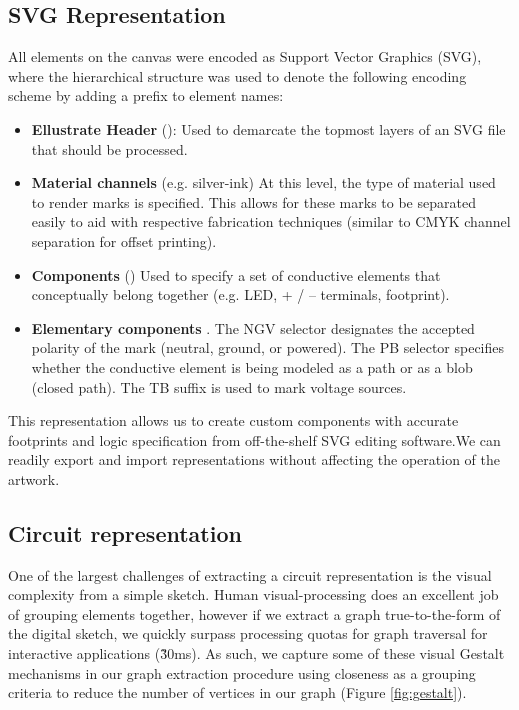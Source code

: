 \documentclass{sigchi}
\begin{document}
    \subsection{SVG Representation}
    All elements on the canvas were encoded as Support Vector Graphics (SVG), where the hierarchical structure was used to denote the following encoding scheme by adding a prefix to element names:
    \begin{itemize}
        \item \textbf{Ellustrate Header} (): Used to demarcate the topmost layers of an SVG file that should be processed.
        \item \textbf{Material channels} (e.g.  silver-ink) At this level, the type of material used to render marks is specified. This allows for these marks to be separated easily to aid with respective fabrication techniques (similar to CMYK channel separation for offset printing).
        \item \textbf{Components} () Used to specify a set of conductive elements that conceptually belong together (e.g. LED, + / – terminals, footprint).
        \item \textbf{Elementary components} .
        The N\textbar G\textbar V selector designates the accepted polarity of the mark (neutral, ground, or powered). The P\textbar B selector specifies whether the conductive element is being modeled as a path or as a blob (closed path). The TB suffix is used to mark voltage sources.
    \end{itemize}

    This representation allows us to create custom components with accurate footprints and logic specification from off-the-shelf SVG editing software.We can readily export and import representations without affecting the operation of the artwork. 

    \subsection{Circuit representation}
      One of the largest challenges of extracting a circuit representation is the visual complexity from a simple sketch. Human visual-processing does an excellent job of grouping elements together, however if we extract a graph true-to-the-form of the digital sketch, we quickly surpass processing quotas for graph traversal for interactive applications (\~30ms). As such, we capture some of these visual Gestalt mechanisms in our graph extraction procedure using closeness as a grouping criteria to reduce the number of vertices in our graph (Figure \ref{fig:gestalt}). 
\end{document}

